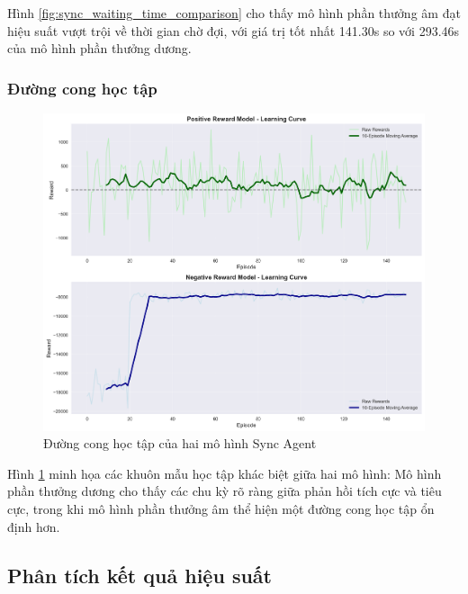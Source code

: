 Hình \ref{fig:sync_waiting_time_comparison} cho thấy mô hình phần thưởng âm đạt hiệu suất vượt trội về thời gian chờ đợi, với giá trị tốt nhất 141.30s so với 293.46s của mô hình phần thưởng dương.

\subsubsection{Đường cong học tập}

\begin{figure}[!htp]
    \centering
    \includegraphics[width=\textwidth]{figures/sync_learning_curves.png}
    \caption{Đường cong học tập của hai mô hình Sync Agent}
    \label{fig:sync_learning_curves}
\end{figure}
Hình \ref{fig:sync_learning_curves} minh họa các khuôn mẫu học tập khác biệt
giữa hai mô hình: Mô hình phần thưởng dương cho thấy các chu kỳ rõ ràng giữa phản hồi tích cực và tiêu cực, trong khi mô hình phần thưởng âm thể hiện một đường cong học tập ổn định hơn.

\subsection{Phân tích kết quả hiệu suất}

